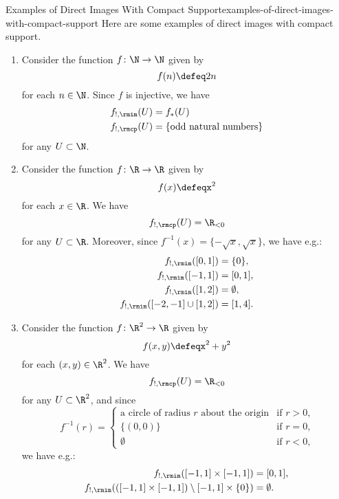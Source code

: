 \begin{example}{Examples of Direct Images With Compact Support}{examples-of-direct-images-with-compact-support}%
    Here are some examples of direct images with compact support.
    \begin{enumerate}
        \item{}Consider the function $f\colon\N\to\N$ given by
            \[
                f(n)
                \defeq
                2n
            \]%
            for each $n\in\N$. Since $f$ is injective, we have
            \begin{align*}
                f_{!,\rmim}(U) &= f_{*}(U)\\
                f_{!,\rmcp}(U) &= \{\text{odd natural numbers}\}
            \end{align*}
            for any $U\subset\N$.
        \item{}Consider the function $f\colon\R\to\R$ given by
            \[
                f(x)%
                \defeq%
                x^{2}
            \]%
            for each $x\in\R$. We have
            \[
                f_{!,\rmcp}(U)%
                =%
                \R_{<0}
            \]%
            for any $U\subset\R$. Moreover, since $f^{-1}(x)=\{-\sqrt{x},\sqrt{x}\}$, we have e.g.:
            \begin{align*}
                f_{!,\rmim}([0,1])            &= \{0\},\\
                f_{!,\rmim}([-1,1])           &= [0,1],\\
                f_{!,\rmim}([1,2])            &= \emptyset,\\
                f_{!,\rmim}([-2,-1]\cup[1,2]) &= [1,4].
            \end{align*}
        \item{}Consider the function $f\colon\R^{2}\to\R$ given by
            \[
                f(x,y)%
                \defeq%
                x^{2}+y^{2}
            \]%
            for each $(x,y)\in\R^{2}$. We have
            \[
                f_{!,\rmcp}(U)%
                =%
                \R_{<0}
            \]%
            for any $U\subset\R^{2}$, and since
            \[
                f^{-1}(r)%
                =
                \begin{cases}
                    \text{a circle of radius $r$ about the origin} &\text{if $r>0$,}\\
                    \{(0,0)\}                                      &\text{if $r=0$,}\\
                    \emptyset                                      &\text{if $r<0$,}
                \end{cases}
            \]%
            we have e.g.:
            \begin{align*}
                f_{!,\rmim}([-1,1]\times[-1,1])                             &= [0,1],\\
                f_{!,\rmim}(([-1,1]\times[-1,1])\setminus[-1,1]\times\{0\}) &= \emptyset.
            \end{align*}
    \end{enumerate}
\end{example}
